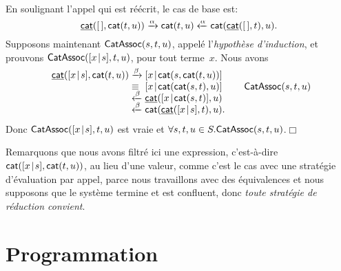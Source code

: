 \noindent En soulignant l'appel qui est réécrit, le cas de base
est:
\begin{equation*} \ufun{cat}(\el,\fun{cat}(t,u))
  \xrightarrow{\smash{\alpha}} \fun{cat}(t,u)
  \xleftarrow{\smash{\alpha}} \fun{cat}(\ufun{cat}(\el,t),u).
  \index{cat@\fun{cat/2}}
\end{equation*}
Supposons maintenant \(\textsf{CatAssoc}({s,t,u})\), appelé
l'\emph{hypothèse d'induction}, et
prouvons
\(\textsf{CatAssoc}({[{x}\!\mid\!{s}],t,u})\),
pour tout terme~\(x\). Nous avons
\begin{equation*}
\begin{array}{r@{\;}l@{\;}l@{\qquad}r@{}}
  \ufun{cat}(\cons{x}{s},\fun{cat}(t,u))
& \xrightarrow{\smash\beta}
& \cons{x}{\fun{cat}(s,\fun{cat}(t,u))}\\
& \equiv
& \cons{x}{\fun{cat}(\fun{cat}(s,t),u)}
& \IH{\pred{CatAssoc}{s,t,u}}\\
& \xleftarrow{\smash\beta}
& \ufun{cat}(\cons{x}{\fun{cat}(s,t)},u)\\
& \xleftarrow{\smash\beta}
& \fun{cat}(\ufun{cat}(\cons{x}{s},t),u).\index{cat@\fun{cat/2}}
\end{array}
\end{equation*}
Donc
\(\textsf{CatAssoc}({[{x}\!\mid\!{s}],t,u})\) est vraie et \(\forall s,t,u \in
S.\textsf{CatAssoc}({s,t,u})\).\hfill\(\Box\)

Remarquons que nous avons filtré ici une expression, c'est-à-dire
\(\textsf{cat}([{x}\!\mid\!{s}],\textsf{cat}(t,u))\), au lieu d'une valeur, comme
c'est le cas avec une stratégie d'évaluation par appel, parce nous
travaillons avec des équivalences et nous supposons que le système
termine et est confluent, donc \emph{toute stratégie de réduction
convient}.

\section{Programmation}
\label{sec:implementation}


